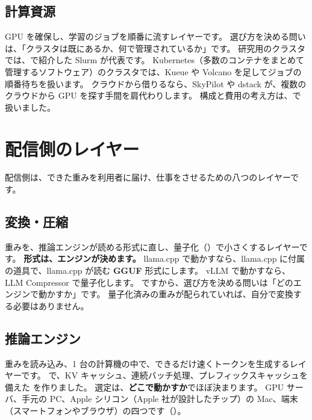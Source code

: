 \subsection{計算資源}\label{sec:tm-compute}

GPU を確保し、学習のジョブを順番に流すレイヤーです。
選び方を決める問いは、「クラスタは既にあるか、何で管理されているか」です。
研究用のクラスタでは、で紹介した Slurm が代表です。
Kubernetes（多数のコンテナをまとめて管理するソフトウェア）のクラスタでは、Kueue や Volcano を足してジョブの順番待ちを扱います。
クラウドから借りるなら、SkyPilot や dstack が、複数のクラウドから GPU を探す手間を肩代わりします。
構成と費用の考え方は、で扱いました。

\section{配信側のレイヤー}\label{sec:tm-serve}

配信側は、できた重みを利用者に届け、仕事をさせるための八つのレイヤーです。

\subsection{変換・圧縮}\label{sec:tm-convert}

重みを、推論エンジンが読める形式に直し、量子化（）で小さくするレイヤーです。
\textbf{形式は、エンジンが決めます。}
llama.cpp で動かすなら、llama.cpp に付属の道具で、llama.cpp が読む \textbf{GGUF} 形式にします。
vLLM で動かすなら、LLM Compressor で量子化します。
ですから、選び方を決める問いは「どのエンジンで動かすか」です。
量子化済みの重みが配られていれば、自分で変換する必要はありません。

\subsection{推論エンジン}\label{sec:tm-engine}

重みを読み込み、1 台の計算機の中で、できるだけ速くトークンを生成するレイヤーです。
で、KV キャッシュ、連続バッチ処理、プレフィックスキャッシュを備えた  を作りました。
選定は、\textbf{どこで動かすか}でほぼ決まります。
GPU サーバ、手元の PC、Apple シリコン（Apple 社が設計したチップ）の Mac、端末（スマートフォンやブラウザ）の四つです（）。

